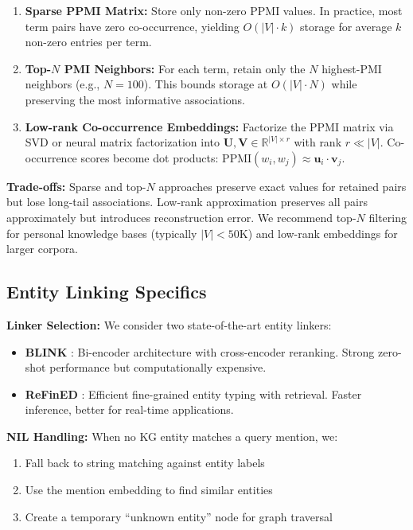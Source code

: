 \documentclass[11pt,a4paper]{article}
\begin{document}
\begin{enumerate}
    \item \textbf{Sparse PPMI Matrix:} Store only non-zero PPMI values. In practice, most term pairs have zero co-occurrence, yielding $O(|V| \cdot k)$ storage for average $k$ non-zero entries per term.
    
    \item \textbf{Top-$N$ PMI Neighbors:} For each term, retain only the $N$ highest-PMI neighbors (e.g., $N = 100$). This bounds storage at $O(|V| \cdot N)$ while preserving the most informative associations.
    
    \item \textbf{Low-rank Co-occurrence Embeddings:} Factorize the PPMI matrix via SVD or neural matrix factorization into $\mathbf{U}, \mathbf{V} \in \mathbb{R}^{|V| \times r}$ with rank $r \ll |V|$. Co-occurrence scores become dot products: $\text{PPMI}(w_i, w_j) \approx \mathbf{u}_i \cdot \mathbf{v}_j$.
\end{enumerate}

\textbf{Trade-offs:} Sparse and top-$N$ approaches preserve exact values for retained pairs but lose long-tail associations. Low-rank approximation preserves all pairs approximately but introduces reconstruction error. We recommend top-$N$ filtering for personal knowledge bases (typically $|V| < 50$K) and low-rank embeddings for larger corpora.

\subsection{Entity Linking Specifics}
\label{sec:entity_linking}

\textbf{Linker Selection:} We consider two state-of-the-art entity linkers:
\begin{itemize}
    \item \textbf{BLINK} \citep{wu2020blink}: Bi-encoder architecture with cross-encoder reranking. Strong zero-shot performance but computationally expensive.
    \item \textbf{ReFinED} \citep{ayoola2022refined}: Efficient fine-grained entity typing with retrieval. Faster inference, better for real-time applications.
\end{itemize}

\textbf{NIL Handling:} When no KG entity matches a query mention, we:
\begin{enumerate}
    \item Fall back to string matching against entity labels
    \item Use the mention embedding to find similar entities
    \item Create a temporary ``unknown entity'' node for graph traversal
\end{enumerate}
\end{document}
